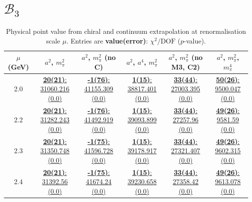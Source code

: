 \documentclass[12pt]{extarticle}
\begin{document}
\section{$\mathcal{B}_3$}
\begin{table}[h!]
\begin{center}
\begin{tabular}{|c|c|c|c|c|c|}
\hline
$\mu$ (GeV) & $a^2$, $m_\pi^2$& $a^2$, $m_\pi^2$ (no C)& $a^2$, $a^4$, $m_\pi^2$& $a^2$, $m_\pi^2$ (no M3, C2)& $a^2$, $m_\pi^2$, $m_\pi^4$\\
\hline
2.0& \hyperlink{SSmPP/NPR/a2m2_20.pdf.1}{\textbf{20(21)}: 31060.216 (0.0)} & \hyperlink{SSmPP/NPR/a2m2noC_20.pdf.1}{\textbf{-1(76)}: 41155.309 (0.0)} & \hyperlink{SSmPP/NPR/a2a4m2_20.pdf.1}{\textbf{1(15)}: 38817.401 (0.0)} & \hyperlink{SSmPP/NPR/a2m2mcut_20.pdf.1}{\textbf{33(44)}: 27003.395 (0.0)} & \hyperlink{SSmPP/NPR/a2m2m4_20.pdf.1}{\textbf{50(26)}: 9500.047 (0.0)}\\
2.2& \hyperlink{SSmPP/NPR/a2m2_22.pdf.1}{\textbf{20(21)}: 31282.243 (0.0)} & \hyperlink{SSmPP/NPR/a2m2noC_22.pdf.1}{\textbf{-1(76)}: 41492.919 (0.0)} & \hyperlink{SSmPP/NPR/a2a4m2_22.pdf.1}{\textbf{1(15)}: 39093.899 (0.0)} & \hyperlink{SSmPP/NPR/a2m2mcut_22.pdf.1}{\textbf{33(44)}: 27257.96 (0.0)} & \hyperlink{SSmPP/NPR/a2m2m4_22.pdf.1}{\textbf{49(26)}: 9581.59 (0.0)}\\
2.3& \hyperlink{SSmPP/NPR/a2m2_23.pdf.1}{\textbf{20(21)}: 31350.748 (0.0)} & \hyperlink{SSmPP/NPR/a2m2noC_23.pdf.1}{\textbf{-1(75)}: 41596.728 (0.0)} & \hyperlink{SSmPP/NPR/a2a4m2_23.pdf.1}{\textbf{1(15)}: 39178.917 (0.0)} & \hyperlink{SSmPP/NPR/a2m2mcut_23.pdf.1}{\textbf{33(44)}: 27321.407 (0.0)} & \hyperlink{SSmPP/NPR/a2m2m4_23.pdf.1}{\textbf{49(26)}: 9602.315 (0.0)}\\
2.4& \hyperlink{SSmPP/NPR/a2m2_24.pdf.1}{\textbf{20(21)}: 31392.56 (0.0)} & \hyperlink{SSmPP/NPR/a2m2noC_24.pdf.1}{\textbf{-1(75)}: 41674.24 (0.0)} & \hyperlink{SSmPP/NPR/a2a4m2_24.pdf.1}{\textbf{1(15)}: 39230.658 (0.0)} & \hyperlink{SSmPP/NPR/a2m2mcut_24.pdf.1}{\textbf{33(44)}: 27358.42 (0.0)} & \hyperlink{SSmPP/NPR/a2m2m4_24.pdf.1}{\textbf{49(26)}: 9613.078 (0.0)}\\
\hline
\end{tabular}
\caption{Physical point value from chiral and continuum extrapolation at renormalisation scale $\mu$. Entries are \textbf{value(error)}: $\chi^2/\text{DOF}$ ($p$-value).}
\end{center}
\end{table}
\end{document}
